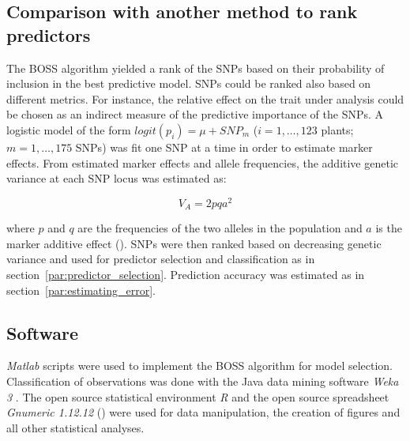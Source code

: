 \subsection{Comparison with another method to rank predictors}
\label{sec:other_ranker}
The BOSS algorithm yielded a rank of the SNPs based on their probability
of inclusion in the best predictive model. SNPs could be ranked also
based on different metrics. For instance, the relative effect on the
trait under analysis could be chosen as an indirect measure of the
predictive importance of the SNPs.
A logistic model of the form $logit(p_i)=\mu+SNP_m$ ($i=1,\ldots,123$
plants; $m=1,\ldots, 175$ SNPs) was fit one SNP
at a time in order to estimate marker effects.
From estimated marker effects and allele frequencies, the additive
genetic variance at each SNP locus was estimated as:

\begin{equation}
V_A=2pqa^2
\end{equation}

where $p$ and $q$ are the frequencies of the two alleles in the
population and $a$ is the marker additive effect
(\cite{gianola2009additive}).
SNPs were then ranked based on decreasing genetic variance and used for
predictor selection and classification as in
section~\ref{par:predictor_selection}. Prediction accuracy was estimated
as in section~\ref{par:estimating_error}.

\subsection{Software}
\label{sec:software}
\emph{Matlab} scripts \cite{MATLAB2010} were used to implement the BOSS
algorithm for model selection. Classification of observations was done
with the Java data mining software \emph{Weka 3} \cite{hall2009weka}.
The open source statistical environment \emph{R} \cite{r2008manual} and
the open source spreadsheet \emph{Gnumeric 1.12.12}
(\cite{gnumeric2014}) were used for data manipulation, the creation of
figures and all other statistical analyses.

